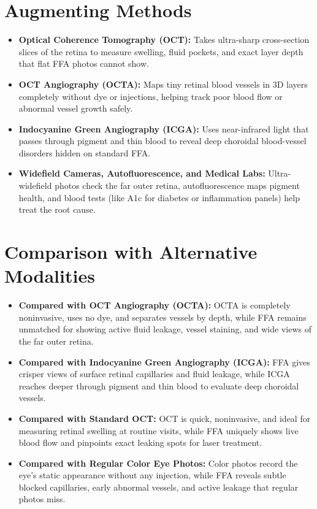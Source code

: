 \section{Augmenting Methods}

\begin{itemize}
    \item \textbf{Optical Coherence Tomography (OCT):} Takes ultra-sharp cross-section slices of the retina to measure swelling, fluid pockets, and exact layer depth that flat FFA photos cannot show.
    \item \textbf{OCT Angiography (OCTA):} Maps tiny retinal blood vessels in 3D layers completely without dye or injections, helping track poor blood flow or abnormal vessel growth safely.
    \item \textbf{Indocyanine Green Angiography (ICGA):} Uses near-infrared light that passes through pigment and thin blood to reveal deep choroidal blood-vessel disorders hidden on standard FFA.
    \item \textbf{Widefield Cameras, Autofluorescence, and Medical Labs:} Ultra-widefield photos check the far outer retina, autofluorescence maps pigment health, and blood tests (like A1c for diabetes or inflammation panels) help treat the root cause.
\end{itemize}

\section{Comparison with Alternative Modalities}

\begin{itemize}
    \item \textbf{Compared with OCT Angiography (OCTA):} OCTA is completely noninvasive, uses no dye, and separates vessels by depth, while FFA remains unmatched for showing active fluid leakage, vessel staining, and wide views of the far outer retina.
    \item \textbf{Compared with Indocyanine Green Angiography (ICGA):} FFA gives crisper views of surface retinal capillaries and fluid leakage, while ICGA reaches deeper through pigment and thin blood to evaluate deep choroidal vessels.
    \item \textbf{Compared with Standard OCT:} OCT is quick, noninvasive, and ideal for measuring retinal swelling at routine visits, while FFA uniquely shows live blood flow and pinpoints exact leaking spots for laser treatment.
    \item \textbf{Compared with Regular Color Eye Photos:} Color photos record the eye's static appearance without any injection, while FFA reveals subtle blocked capillaries, early abnormal vessels, and active leakage that regular photos miss.
\end{itemize}

